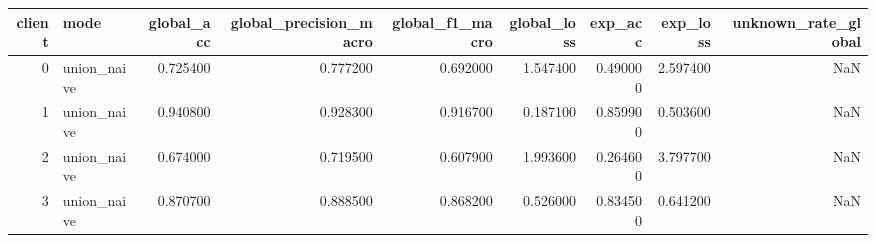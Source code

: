 \begin{tabular}{rlrrrrrrr}
\toprule
client & mode & global_acc & global_precision_macro & global_f1_macro & global_loss & exp_acc & exp_loss & unknown_rate_global \\
\midrule
0 & union_naive & 0.725400 & 0.777200 & 0.692000 & 1.547400 & 0.490000 & 2.597400 & NaN \\
1 & union_naive & 0.940800 & 0.928300 & 0.916700 & 0.187100 & 0.859900 & 0.503600 & NaN \\
2 & union_naive & 0.674000 & 0.719500 & 0.607900 & 1.993600 & 0.264600 & 3.797700 & NaN \\
3 & union_naive & 0.870700 & 0.888500 & 0.868200 & 0.526000 & 0.834500 & 0.641200 & NaN \\
\bottomrule
\end{tabular}

